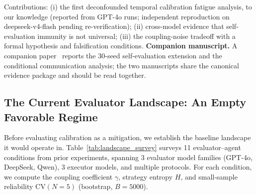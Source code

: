 \documentclass[11pt]{article}
\newcommand{\CV}{\ensuremath{\mathrm{CV}}}
\theoremstyle{definition}
\theoremstyle{remark}
\begin{document}
\noindent Contributions: (i) the first deconfounded temporal calibration fatigue analysis, to our knowledge (reported from GPT-4o runs; independent reproduction on deepseek-v4-flash pending re-verification); (ii) cross-model evidence that self-evaluation immunity is not universal; (iii) the coupling-noise tradeoff with a formal hypothesis and falsification conditions. \textbf{Companion manuscript.} A companion paper~\citep{companion2026} reports the 30-seed self-evaluation extension and the conditional communication analysis; the two manuscripts share the canonical evidence package and should be read together.

\subsection{The Current Evaluator Landscape: An Empty Favorable Regime}

Before evaluating calibration as a mitigation, we establish the baseline landscape it would operate in. Table~\ref{tab:landscape_survey} surveys 11 evaluator--agent conditions from prior experiments, spanning 3 evaluator model families (GPT-4o, DeepSeek, Qwen), 3 executor models, and multiple protocols. For each condition, we compute the coupling coefficient $\gamma$, strategy entropy $H$, and small-sample reliability $\CV(N{=}5)$ (bootstrap, $B{=}5000$).
\end{document}
